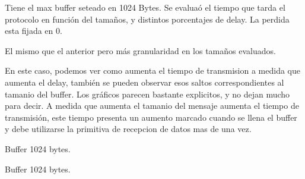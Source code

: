 Tiene el max buffer seteado en 1024 Bytes. Se evalua\'o el tiempo que tarda el protocolo en funci\'on del tama\~nos, y distintos porcentajes de delay. La perdida esta fijada en 0. 

El mismo que el anterior pero m\'as granularidad en los tama\~nos evaluados.

En este caso, podemos ver como aumenta el tiempo de transmision a medida que aumenta el delay, tambi\'en se pueden observar  esos saltos correspondientes al tamanio del buffer. Los gr\'aficos parecen bastante explicitos, y no dejan mucho para decir. A medida que aumenta el tamanio del mensaje aumenta el tiempo de transmisi\'on, este tiempo presenta un aumento marcado cuando se llena el buffer y debe utilizarse la primitiva de recepcion de datos mas de una vez.



Buffer 1024 bytes. 

Buffer 1024 bytes.